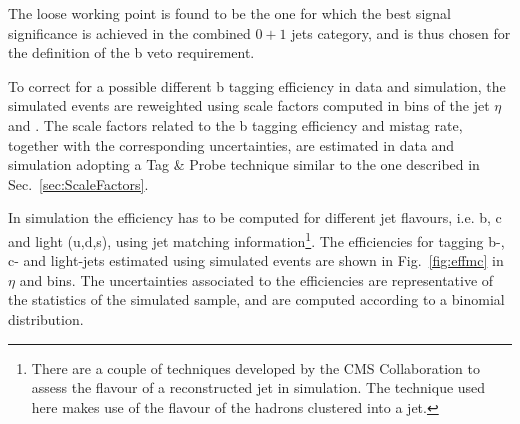 The loose working point is found to be the one for which the best signal significance is achieved in the combined $0+1$ jets category, and is thus chosen for the definition of the b veto requirement.

To correct for a possible different b tagging efficiency in data and simulation, the simulated events are reweighted using scale factors computed in bins of the jet $\eta$ and \pt.
The scale factors related to the b tagging efficiency and mistag rate, together with the corresponding uncertainties, are estimated in data and simulation adopting a Tag \& Probe technique similar to the one described in Sec.~\ref{sec:ScaleFactors}.

In simulation the efficiency has to be computed for different jet flavours, i.e. b, c and light (u,d,s), using jet matching information\footnote{There are a couple of techniques developed by the CMS Collaboration to assess the flavour of a reconstructed jet in simulation. The technique used here makes use of the flavour of the hadrons clustered into a jet.}.
The efficiencies for tagging b-, c- and light-jets estimated using \ttbar simulated events are shown in Fig.~\ref{fig:effmc} in $\eta$ and \pt bins. The uncertainties associated to the efficiencies are representative of the statistics of the simulated \ttbar sample, and are computed according to a binomial distribution.

